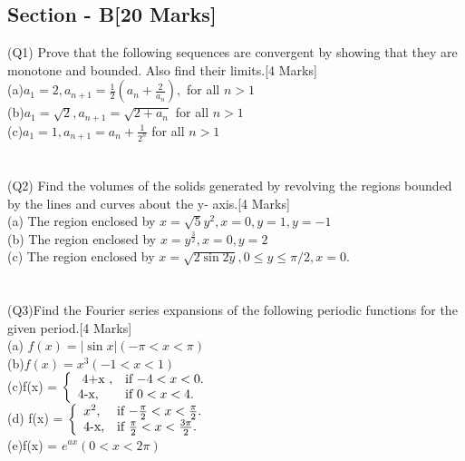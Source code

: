 \documentclass[12pt]{article}
\begin{document}
{\newpage
\begin{center}
\subsection{\textbf{Section - B\hspace*{2cm}[20 Marks]}}
\end{center}

(Q1) Prove that the following sequences are convergent by showing that they are monotone and bounded. Also find their limits.\hspace*{1.5cm}[4 Marks]\\
(a)$a_{1}=2,a_{n+1} = \frac{1}{2}(a_{n} + \frac{2}{a_{n}}),$ for all $n>1$ \\
(b)$a_{1}=\sqrt{2} ,a_{n+1}=\sqrt{2+a_{n}}$ for all $n>1$  \\
(c)$a_{1}=1 ,a_{n+1}=a_{n} + \frac{1}{2^{n}}$ for all $n>1$\\\\\\

(Q2) Find the volumes of the solids generated by revolving the regions bounded by the lines and curves about the y- axis.\hspace*{3cm}[4 Marks]\\
(a) The region enclosed by $x = \sqrt{5}y^2 , x = 0, y=1,y= -1$\\
(b) The region enclosed by $x = y^\frac{3}{2} , x=0 , y= 2$\\
(c) The region enclosed by $ x = \sqrt{2\sin 2y}, 0 \leq y \leq \pi/2 , x=0.$\\\\\\

(Q3)Find the Fourier series expansions of the following periodic functions for the given period.\hspace*{9cm}[4 Marks]\\
(a) $f(x) = |\sin x| ({-\pi}< x < \pi)$\\
(b)$ f(x) = x^3 ({-1} < x < 1)$\\
(c)f(x) = \begin{math}
  \left\{
    \begin{array}{ll}
     $ 4+x $,  & \mbox{if $-4<x<0$}.\\
      $4-x$, & \mbox{if $0<x<4$}.
    \end{array}
  \right.
\end{math} 
\\(d) f(x) =  \begin{math}
  \left\{
    \begin{array}{ll}
     x^{2},  & \mbox{if ${-\frac{\pi}{2}}<x<\frac{\pi}{2}$}.\\
      $4-x$, & \mbox{if $\frac{\pi}{2}<x<\frac{3\pi}{2}$}.
    \end{array}
  \right.
\end{math} 
\\(e)f(x) = $e^{ax} (0<x<2{\pi})$\\\\\\

}
\end{document}
